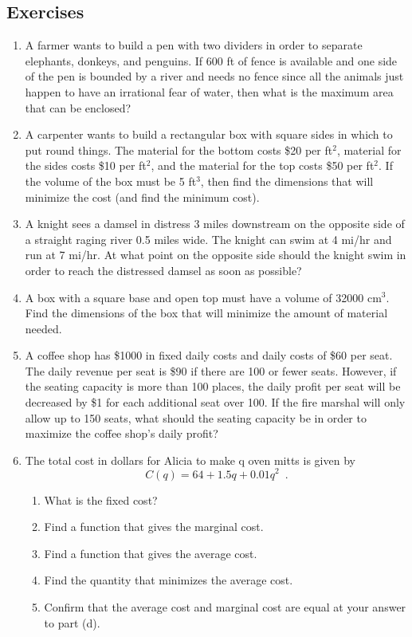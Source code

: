 \subsection{Exercises}
  \begin{enumerate}
    \item A farmer wants to build a pen with two dividers in order to separate elephants, donkeys, and penguins. If 600 ft of fence is available and one side of the pen is bounded by a river and needs no fence since all the animals just happen to have an irrational fear of water, then what is the maximum area that can be enclosed?

    \item A carpenter wants to build a rectangular box with square sides in which to put round things. The material for the bottom costs \$20 per ft$^2$, material for the sides costs \$10 per ft$^2$, and the material for the top costs \$50 per ft$^2$. If the volume of the box must be 5 ft$^3$, then find the dimensions that will minimize the cost (and find the minimum cost).

    \item A knight sees a damsel in distress 3 miles downstream on the opposite side of a straight raging river 0.5 miles wide. The knight can swim at 4 mi/hr and run at 7 mi/hr. At what point on the opposite side should the knight swim in order to reach the distressed damsel as soon as possible?

    \item A box with a square base and open top must have a volume of 32000 cm$^3$. Find the dimensions of the box that will minimize the amount of material needed.

    \item A coffee shop has \$1000 in fixed daily costs and daily costs of \$60 per seat. The daily revenue per seat is \$90 if there are 100 or fewer seats. However, if the seating capacity is more than 100 places, the daily profit per seat will be decreased by \$1 for each additional seat over 100. If the fire marshal will only allow up to 150 seats, what should the seating capacity be in order to maximize the coffee shop’s daily profit?

    \item The total cost in dollars for Alicia to make q oven mitts is given by
    $$C(q) = 64 + 1.5q + 0.01q^2 \enspace .$$
    \begin{enumerate}[label=(\alph*)]
        \item What is the fixed cost?
        \item Find a function that gives the marginal cost.
        \item Find a function that gives the average cost.
        \item Find the quantity that minimizes the average cost.
        \item Confirm that the average cost and marginal cost are equal at your answer to part (d).
      \end{enumerate}


\end{enumerate}
